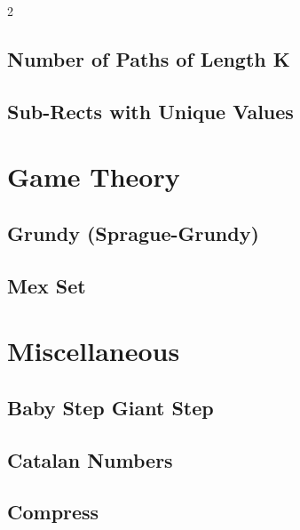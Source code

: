 \documentclass[10pt,a4paper]{extarticle}
\begin{document}
\begin{landscape}
\begin{multicols}{2}
\subsection{Number of Paths of Length K}


\subsection{Sub-Rects with Unique Values}


\section{Game Theory}

\subsection{Grundy (Sprague-Grundy)}


\subsection{Mex Set}


\section{Miscellaneous}

\subsection{Baby Step Giant Step}


\subsection{Catalan Numbers}


\subsection{Compress}



\end{multicols}
\end{landscape}
\end{document}
